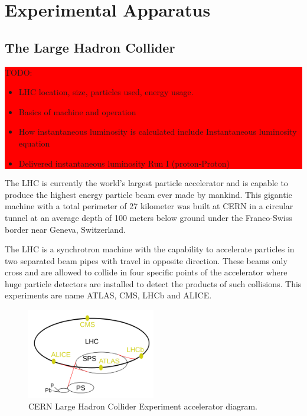 \chapter{Experimental Apparatus}
\label{CHAPTER:ExperimentalApparatus}




\section{The Large Hadron Collider}
\label{SECTION:ExperimentalApparatus_LHC}

\colorbox{red}{
\begin{minipage}{0.95\linewidth}
TODO: 

\begin{itemize}
  \item LHC location, size, particles used, energy usage.
  \item Basics of machine and operation
  \item How instantaneous luminosity is calculated include Instantaneous luminosity equation
  \item Delivered instantaneous luminosity Run I (proton-Proton)
\end{itemize}

\end{minipage}
}

The \gls{LHC} \cite{ARTICLE:LHC Machine} is currently the world's largest particle accelerator and is capable to produce the highest energy particle beam ever made by mankind. This gigantic machine with a total perimeter of 27 kilometer was built at \gls{CERN} in a circular tunnel at an average depth of 100 meters below ground under the Franco-Swiss border near Geneva, Switzerland.

The \gls{LHC} is a synchrotron machine with the capability to accelerate particles in two separated beam pipes with travel in opposite direction. These beams only cross and are allowed to collide in four specific points of the accelerator where huge particle detectors are installed to detect the products of such collisions. This experiments are name ATLAS, CMS, LHCb and ALICE.

\begin{figure}[!htb]
  \centering
  \includegraphics[width=0.50\textwidth]{Chapter02_ExperimentalApparatus/Images/LHCAccelaratorChain.png}
  \caption{CERN Large Hadron Collider Experiment accelerator diagram.}
  \label{FIGURE:ExperimentalApparatus_LHCAccelaratorChain}
\end{figure}

